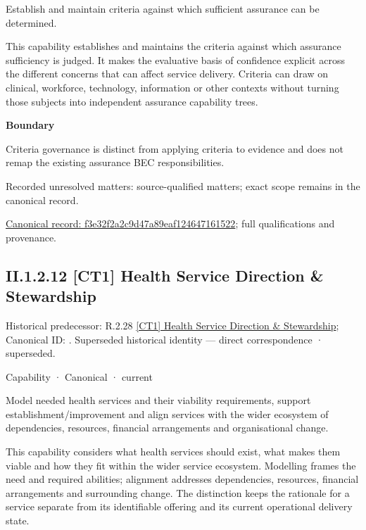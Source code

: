 Establish and maintain criteria against which sufficient assurance can be determined.



This capability establishes and maintains the criteria against which assurance sufficiency is judged. It makes the evaluative basis of confidence explicit across the different concerns that can affect service delivery. Criteria can draw on clinical, workforce, technology, information or other contexts without turning those subjects into independent assurance capability trees.



\textbf{Boundary}



Criteria governance is distinct from applying criteria to evidence and does not remap the existing assurance BEC responsibilities.


{\small Recorded unresolved matters: source-qualified matters; exact scope remains in the canonical record.}\par
{\footnotesize \href{../../../../continuum/strategy/capability/f3e32f2a2c9d47a89eaf124647161522.md}{Canonical record: f3e32f2a2c9d47a89eaf124647161522}; full qualifications and provenance.}\par
\subsection*{II.1.2.12 [CT1] Health Service Direction \& Stewardship}
\label{navigation:II.1.2.12}

{\small Historical predecessor: R.2.28 \hyperref[element:360bf50f92484448a01cc57f2dbce23c]{[CT1] Health Service Direction \& Stewardship}; Canonical ID: \texttt{}. Superseded historical identity — direct correspondence · superseded.}\par
\label{element:d51e7125bf9c4d2c9c59b60346b4d86f}
{\small Capability · Canonical · current}\par

Model needed health services and their viability requirements, support establishment/improvement and align services with the wider ecosystem of dependencies, resources, financial arrangements and organisational change.



This capability considers what health services should exist, what makes them viable and how they fit within the wider service ecosystem. Modelling frames the need and required abilities; alignment addresses dependencies, resources, financial arrangements and surrounding change. The distinction keeps the rationale for a service separate from its identifiable offering and its current operational delivery state.



